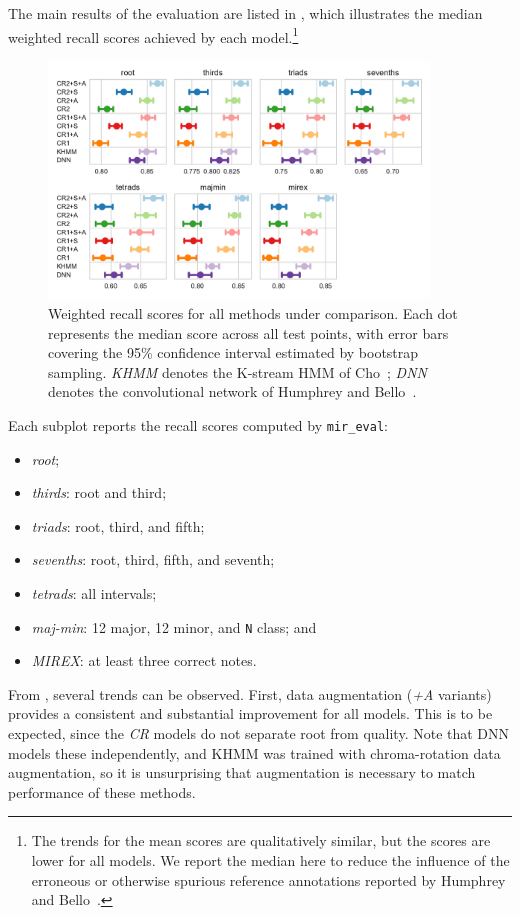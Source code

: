 \documentclass{article}
\begin{document}
The main results of the evaluation are listed in , which illustrates the median weighted recall scores achieved by each model.\footnote{The trends for the mean scores are qualitatively similar, but the scores are lower for all models. We report the median here to reduce the influence of the erroneous or otherwise spurious reference annotations reported by Humphrey and Bello~\cite{humphrey2015four}.}
\begin{figure}[t]
    \centering
    \includegraphics[width=0.9\textwidth]{crnn-scores}
    \caption{Weighted recall scores for all methods under comparison.  Each dot represents the median score across all test points, with error bars covering the 95\% confidence interval estimated by bootstrap sampling.
        \emph{KHMM} denotes the K-stream HMM of Cho~\cite{cho2014improved}; \emph{DNN} denotes the convolutional network of Humphrey and Bello~\cite{humphrey2015four}.\label{fig:results}}
\end{figure}
Each subplot reports the recall scores computed by \texttt{mir\_eval}:
\begin{itemize}
    \item \emph{root};
    \item \emph{thirds}: root and third;
    \item \emph{triads}: root, third, and fifth;
    \item \emph{sevenths}: root, third, fifth, and seventh;
    \item \emph{tetrads}: all intervals;
    \item \emph{maj-min}: 12 major, 12 minor, and \texttt{N} class; and
    \item \emph{MIREX}: at least three correct notes.
\end{itemize}

From , several trends can be observed.
First, data augmentation (\emph{+A} variants) provides a consistent and substantial improvement for all models.
This is to be expected, since the \emph{CR} models do not separate root from quality.
Note that DNN models these independently, and KHMM was trained with chroma-rotation data augmentation, so it is unsurprising that augmentation is necessary to match performance of these methods.
\end{document}
